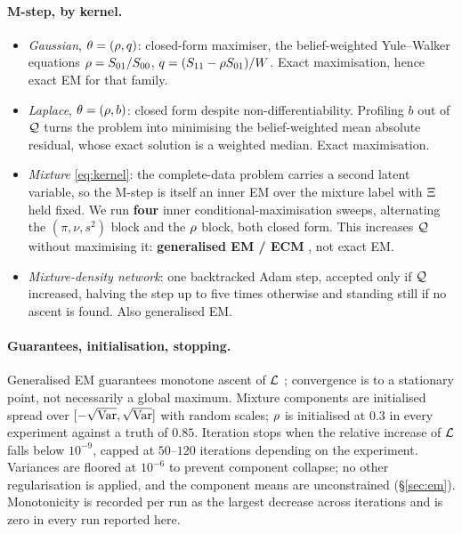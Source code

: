 \paragraph{M-step, by kernel.}
\begin{itemize}\itemsep2pt
\item \emph{Gaussian}, $\theta=(\rho,q)$: closed-form maximiser, the belief-weighted
      Yule--Walker equations $\rho = S_{01}/S_{00}$, $q = (S_{11}-\rho S_{01})/W$. Exact
      maximisation, hence exact EM for that family.
\item \emph{Laplace}, $\theta=(\rho,b)$: closed form despite non-differentiability. Profiling
      $b$ out of $\mathcal{Q}$ turns the problem into minimising the belief-weighted mean absolute
      residual, whose exact solution is a weighted median. Exact maximisation.
\item \emph{Mixture} \eqref{eq:kernel}: the complete-data problem carries a second latent
      variable, so the M-step is itself an inner EM over the mixture label with
      $\Xi$ held fixed. We run \textbf{four} inner conditional-maximisation sweeps, alternating
      the $(\pi,\nu,s^2)$ block and the $\rho$ block, both closed form. This increases $\mathcal{Q}$
      without maximising it: \textbf{generalised EM / ECM} \citep{meng1993}, not exact EM.
\item \emph{Mixture-density network}: one backtracked Adam step, accepted only if $\mathcal{Q}$
      increased, halving the step up to five times otherwise and standing still if no ascent is
      found. Also generalised EM.
\end{itemize}

\paragraph{Guarantees, initialisation, stopping.} Generalised EM guarantees monotone ascent of
$\mathcal{L}$ \citep{dempster1977,wu1983}; convergence is to a stationary point, not necessarily a global
maximum. Mixture components are initialised spread over $[-\sqrt{\operatorname{Var}}, \sqrt{\operatorname{Var}}]$ with random
scales; $\rho$ is initialised at $0.3$ in every experiment against a truth of $0.85$. Iteration
stops when the relative increase of $\mathcal{L}$ falls below $10^{-9}$, capped at $50$--$120$
iterations depending on the experiment. Variances are floored at $10^{-6}$ to prevent component
collapse; no other regularisation is applied, and the component means are unconstrained
(\S\ref{sec:em}). Monotonicity is recorded per run as the largest decrease across iterations and
is zero in every run reported here.

